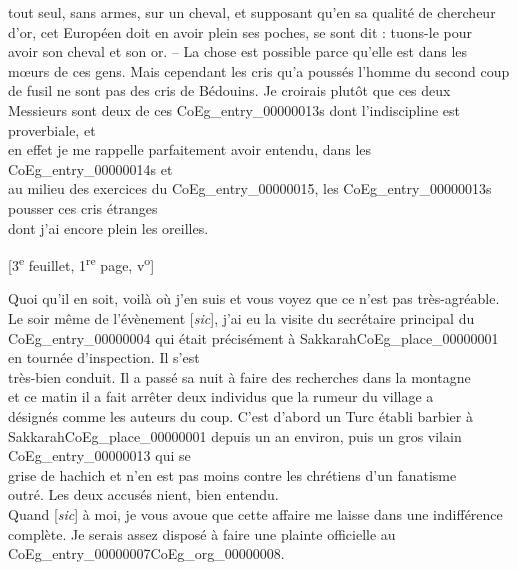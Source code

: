 \documentclass{book}
\begin{document}
tout seul, sans armes, sur un cheval, et supposant qu’en sa qualité de chercheur\\
d’or, cet Européen doit en avoir plein ses poches, se sont dit : tuons-le pour\\
avoir son cheval et son or. – La chose est possible parce qu’elle est dans les\\
mœurs de ces gens. Mais cependant les cris qu’a poussés l’homme du second coup\\
de fusil ne sont pas des cris de Bédouins. Je croirais plutôt que ces deux\\
Messieurs sont deux de ces \glspl{CoEg_entry_00000013} dont l’indiscipline est proverbiale, et\\
en effet je me rappelle parfaitement avoir entendu, dans les \glspl{CoEg_entry_00000014} et\\
au milieu des exercices du \gls{CoEg_entry_00000015}, les \Glspl{CoEg_entry_00000013} pousser ces cris étranges\\
dont j’ai encore plein les oreilles.
{\footnotesize\begin{center} {[3\textsuperscript{e} feuillet, 1\textsuperscript{re} page, v\textsuperscript{o}]}\end{center}}
\indent Quoi qu’il en soit, voilà où j’en suis et vous voyez que ce n’est pas très-agréable.\\
\indent Le soir même de l’évènement {[\textit{sic}]}, j’ai eu la visite du secrétaire principal du\\
\Gls{CoEg_entry_00000004} qui était précisément à Sakkarah\gls{CoEg_place_00000001} en tournée d’inspection. Il s’est\\
très-bien conduit. Il a passé sa nuit à faire des recherches dans la montagne\\
et ce matin il a fait arrêter deux individus que la rumeur du village a\\
désignés comme les auteurs du coup. C’est d’abord un Turc établi barbier à\\
Sakkarah\gls{CoEg_place_00000001} depuis un an environ, puis un gros vilain \Gls{CoEg_entry_00000013} qui se\\
grise de hachich et n’en est pas moins contre les chrétiens d’un fanatisme\\
outré. Les deux accusés nient, bien entendu.\\
\indent Quand {[\textit{sic}]} à moi, je vous avoue que cette affaire me laisse dans une indifférence\\
complète. Je serais assez disposé à faire une plainte officielle au \gls{CoEg_entry_00000007}\gls{CoEg_org_00000008}.\\
\end{document}

